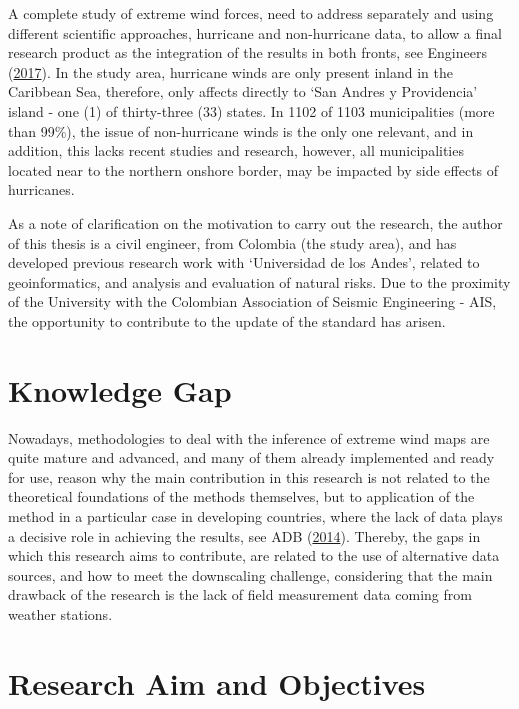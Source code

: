 \documentclass[12pt,oneside]{reedthesis}
\begin{document}
A complete study of extreme wind forces, need to address separately and using different scientific approaches, hurricane and non-hurricane data, to allow a final research product as the integration of the results in both fronts, see Engineers (\protect\hyperlink{ref-Asce2017}{2017}). In the study area, hurricane winds are only present inland in the Caribbean Sea, therefore, only affects directly to `San Andres y Providencia' island - one (1) of thirty-three (33) states. In 1102 of 1103 municipalities (more than 99\%), the issue of non-hurricane winds is the only one relevant, and in addition, this lacks recent studies and research, however, all municipalities located near to the northern onshore border, may be impacted by side effects of hurricanes.

As a note of clarification on the motivation to carry out the research, the author of this thesis is a civil engineer, from Colombia (the study area), and has developed previous research work with `Universidad de los Andes', related to geoinformatics, and analysis and evaluation of natural risks. Due to the proximity of the University with the Colombian Association of Seismic Engineering - AIS, the opportunity to contribute to the update of the standard has arisen.

\hypertarget{knowledge-gap}{%
\section{Knowledge Gap}\label{knowledge-gap}}

Nowadays, methodologies to deal with the inference of extreme wind maps are quite mature and advanced, and many of them already implemented and ready for use, reason why the main contribution in this research is not related to the theoretical foundations of the methods themselves, but to application of the method in a particular case in developing countries, where the lack of data plays a decisive role in achieving the results, see ADB (\protect\hyperlink{ref-windassessment}{2014}). Thereby, the gaps in which this research aims to contribute, are related to the use of alternative data sources, and how to meet the downscaling challenge, considering that the main drawback of the research is the lack of field measurement data coming from weather stations.

\hypertarget{research-aim-and-objectives}{%
\section{Research Aim and Objectives}\label{research-aim-and-objectives}}
\end{document}
